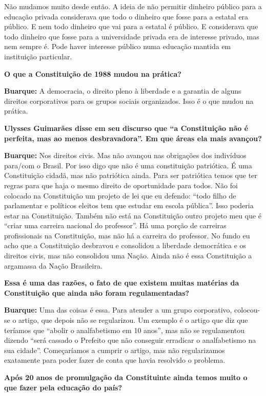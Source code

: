 Não mudamos muito desde então. A ideia de não permitir dinheiro público
para a educação privada considerava que todo o dinheiro que fosse para a
estatal era público. E nem todo dinheiro que vai para a estatal é
público. E considerava que todo dinheiro que fosse para a universidade
privada era de interesse privado, mas nem sempre é. Pode haver interesse
público numa educação mantida em instituição particular.

\textbf{O que a Constituição de 1988 mudou na prática?}

\textbf{Buarque:} A democracia, o direito pleno à liberdade e a garantia
de alguns direitos corporativos para os grupos sociais organizados. Isso
é o que mudou na prática.

\textbf{Ulysses Guimarães disse em seu discurso que ``a Constituição não
é perfeita, mas ao menos desbravadora''. Em que áreas ela mais avançou?}

\textbf{Buarque:} Nos direitos civis. Mas não avançou nas obrigações dos
indivíduos para/com o Brasil. Por isso digo que não é uma constituição
patriótica. É uma Constituição cidadã, mas não patriótica ainda. Para
ser patriótica temos que ter regras para que haja o mesmo direito de
oportunidade para todos. Não foi colocado na Constituição um projeto de
lei que eu defendo: ``todo filho de parlamentar e políticos eleitos tem
que estudar em escola pública''. Isso poderia estar na Constituição.
Também não está na Constituição outro projeto meu que é ``criar uma
carreira nacional do professor''. Há uma porção de carreiras
profissionais na Constituição, mas não há a carreira do professor. No
fundo eu acho que a Constituição desbravou e consolidou a liberdade
democrática e os direitos civis, mas não consolidou uma Nação. Ainda não
é essa Constituição a argamassa da Nação Brasileira.

\textbf{Essa é uma das razões, o fato de que existem muitas matérias da
Constituição que ainda não foram regulamentadas?}

\textbf{Buarque:} Uma das coisas é essa. Para atender a um grupo
corporativo, colocou-se o artigo, que depois não se regularizou. Um
exemplo é o artigo que diz que teríamos que ``abolir o analfabetismo em
10 anos'', mas não se regulamentou dizendo ``será cassado o Prefeito que
não conseguir erradicar o analfabetismo na sua cidade''. Começaríamos a
cumprir o artigo, mas não regularizamos exatamente para poder fazer de
conta que havia resolvido o problema.

\textbf{Após 20 anos de promulgação da Constituinte ainda temos muito o
que fazer pela educação do país?}

